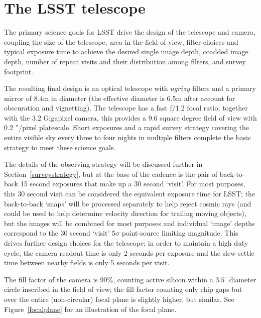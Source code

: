 \documentclass{iau}
\begin{document}

\section{The LSST telescope}

The primary science goals for LSST drive the design of the telescope
and camera, coupling the size of the telescope, area in the field of
view, filter choices and typical exposure time to achieve the desired
single image depth, coadded image depth, number of repeat visits and
their distribution among filters, and survey footprint.

The resulting final design is an optical telescope with
$ugrizy$ filters and a primary mirror of 8.4m in
diameter (the effective diameter is 6.5m after account for obscuration
and vignetting). The telescope has a fast f/1.2 focal ratio; together
with the 3.2 Gigapixel camera, this provides a 9.6 square degree field
of view with 0.2 ''/pixel platescale. Short exposures and a rapid
survey strategy covering the entire visible sky every three to four
nights in multiple filters complete the basic strategy to meet these
science goals.

The details of the observing strategy will be discussed further in
Section~\ref{surveystrategy}, but at the base of the cadence is the
pair of back-to-back 15 second exposures that make up a 30 second
`visit'. For most purposes, this 30 second visit can be considered the
equivalent exposure time for LSST; the back-to-back `snaps' will be
processed separately to help reject cosmic rays (and could be used to
help determine velocity direction for trailing moving objects), but
the images will be combined for most purposes and individual `image'
depths correspond to the 30 second `visit' $5\sigma$ point-source
limiting magnitude. This drives further design choices for the
telescope; in order to maintain a high duty cycle, the camera readout time
is only 2 seconds per exposure and the slew-settle time between
nearby fields is only 5 seconds per visit.

The fill factor of the camera is 90\%, counting active silicon within
a $3.5^\circ$ diameter circle inscribed in the field of view; the fill
factor counting only chip gaps but over the entire (non-circular)
focal plane is slightly higher, but similar. See
Figure~\ref{focalplane} for an illustration of the focal plane.
\end{document}
